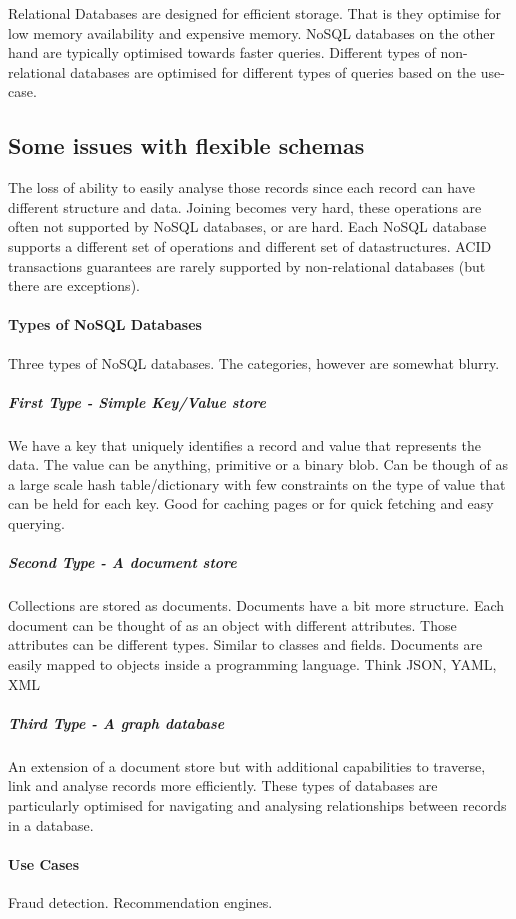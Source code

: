 Relational Databases are designed for efficient storage.
That is they optimise for low memory availability and expensive memory.
NoSQL databases on the other hand are typically optimised towards faster queries.
Different types of non-relational databases are optimised for different types of queries based on the use-case.

\subsection{Some issues with flexible schemas}
The loss of ability to easily analyse those records since each record can have different structure and data.
Joining becomes very hard, these operations are often not supported by NoSQL databases, or are hard.
Each NoSQL database supports a different set of operations and different set of datastructures.
ACID transactions guarantees are rarely supported by non-relational databases (but there are exceptions).

\paragraph{Types of NoSQL Databases}
Three types of NoSQL databases.
The categories, however are somewhat blurry.

\subparagraph{First Type - Simple Key/Value store}
We have a key that uniquely identifies a record and value that represents the data.
The value can be anything, primitive or a binary blob.
Can be though of as a large scale hash table/dictionary with few constraints on the type of value that can be held for each key.
Good for caching pages or for quick fetching and easy querying.

\subparagraph{Second Type - A document store}
Collections are stored as documents.
Documents have a bit more structure.
Each document can be thought of as an object with different attributes.
Those attributes can be different types.
Similar to classes and fields.
Documents are easily mapped to objects inside a programming language.
Think JSON, YAML, XML

\subparagraph{Third Type - A graph database}
An extension of a document store but with additional capabilities to traverse, link and analyse records more efficiently.
These types of databases are particularly optimised for navigating and analysing relationships between records in a database.

\paragraph{Use Cases}
Fraud detection.
Recommendation engines.

